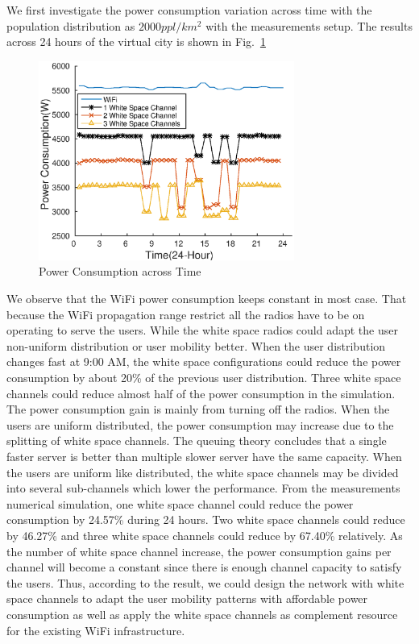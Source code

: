 We first investigate the power consumption variation across time with the population distribution 
as $2000 ppl/km^2$ with the measurements setup. The results across 24 hours of the virtual city 
is shown in Fig.~\ref{fig:timevary}

\begin{figure}[hpt]
\vspace{-0.0in}
\centering
\includegraphics[width=84mm]{figures/timevary}
\vspace{-0.1in}
\caption{Power Consumption across Time}
\label{fig:timevary}
\vspace{-0.1in}
\end{figure}

We observe that the WiFi power consumption keeps constant in most case. That because the WiFi 
propagation range restrict all the radios have to be on operating to serve the users. While the 
white space radios could adapt the user non-uniform distribution or user mobility better. When the 
user distribution changes fast at 9:00 AM, the white space configurations could reduce the power 
consumption by about 20\% of the previous user distribution. Three white space channels could 
reduce almost half of the power consumption in the simulation. 
The power consumption gain is mainly from turning off the radios.
When the users are uniform distributed, the power consumption may increase due to the splitting of
white space channels. The queuing theory concludes that a single faster server is better than 
multiple slower server have the same capacity. When the users are uniform like distributed, the 
white space channels may be divided into several sub-channels which lower the performance. 
From the measurements numerical simulation, one white space channel could reduce the power consumption 
by 24.57\% during 24 hours. Two white space channels could reduce by 46.27\% and three white space channels 
could reduce by 67.40\% relatively. 
As the number of white space channel increase, the power consumption gains per channel will become a 
constant since there is enough channel capacity to satisfy the users.
Thus, according to the result, we could design the network with white space channels to adapt the user 
mobility patterns with affordable power consumption as well as apply the 
white space channels as complement resource for the existing WiFi infrastructure.



